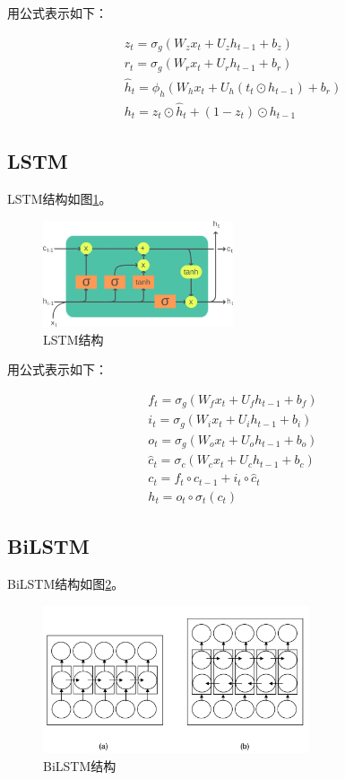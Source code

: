 \documentclass{article}
\begin{document}
用公式表示如下：

\begin{gather*}
    z_t = \sigma_g(W_z x_t + U_z h_{t-1} + b_z) \\
    r_t = \sigma_g(W_r x_t + U_r h_{t-1} + b_r) \\
    \hat{h}_t = \phi_h\left(W_h x_t + U_h (t_t \odot h_{t-1}) + b_r\right) \\
    h_t = z_t \odot \hat{h}_t + (1 - z_t) \odot h_{t-1}
\end{gather*}

\subsection{LSTM}

LSTM结构如图\ref{LSTM}。

\begin{figure}[H]
    \centering
    \includegraphics[width=0.5\textwidth]{figures/lstm.png}
    \caption{LSTM结构}
    \label{LSTM}
\end{figure}

用公式表示如下：

\begin{gather*}
    f_t = \sigma_g(W_f x_t + U_f h_{t-1} + b_f) \\
    i_t = \sigma_g(W_i x_t + U_i h_{t-1} + b_i) \\
    o_t = \sigma_g(W_o x_t + U_o h_{t-1} + b_o) \\
    \hat{c}_t = \sigma_c(W_c x_t + U_c h_{t-1} + b_c) \\
    c_t = f_t \circ c_{t-1} + i_t \circ \hat{c}_t \\
    h_t = o_t \circ \sigma_t(c_t)
\end{gather*}

\subsection{BiLSTM}

BiLSTM结构如图\ref{BiLSTM}。

\begin{figure}[H]
    \centering
    \includegraphics[width=0.7\textwidth]{figures/bilstm.png}
    \caption{BiLSTM结构}
    \label{BiLSTM}
\end{figure}
\end{document}
